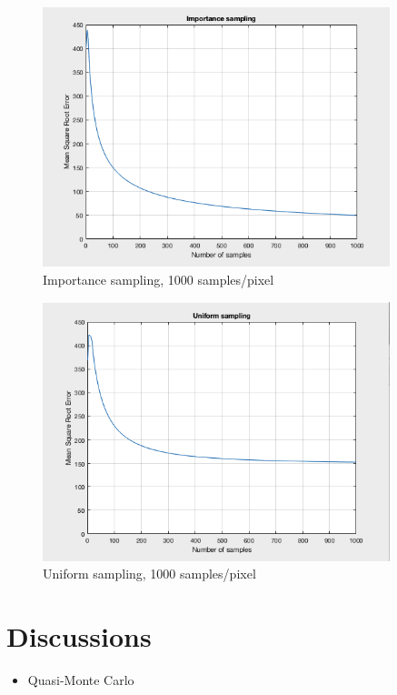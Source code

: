 \documentclass[10pt]{beamer}
\begin{document}
\begin{frame}
	\begin{figure}[H]
  \centering
    \includegraphics[width=0.9\textwidth]{importance_sampling.png}
    \caption{Importance sampling, 1000 samples/pixel}
\end{figure}
\end{frame}

\begin{frame}
	\begin{figure}[H]
  \centering
    \includegraphics[width=0.9\textwidth]{direct_sampling.png}
    \caption{Uniform sampling, 1000 samples/pixel}
\end{figure}
\end{frame}

\section{Discussions}
\begin{frame}{}
\begin{itemize}
\item Quasi-Monte Carlo
\end{itemize}
\end{frame}
\end{document}
